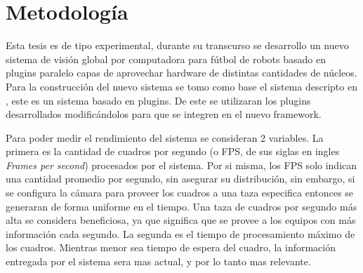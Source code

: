 
\section{Metodología}

Esta tesis es de tipo experimental, durante su transcurso se desarrollo un
nuevo sistema de visión global por computadora para fútbol de robots basado en
plugins paralelo capas de aprovechar hardware de distintas cantidades de
núcleos. Para la construcción del nuevo sistema se tomo como base el sistema
descripto en \cite{torres2014}, este es un sistema basado en plugins. De este
se utilizaran los plugins desarrollados modificándolos para que se integren en
el nuevo framework.

Para poder medir el rendimiento del sistema se consideran 2 variables. La
primera es la cantidad de cuadros por segundo (o FPS, de sus siglas en ingles
\emph{Frames per second}) procesados por el sistema. Por si misma, los FPS solo
indican una cantidad promedio por segundo, sin asegurar su distribución, sin
embargo, si se configura la cámara para proveer los cuadros a una taza
especifica entonces se generaran de forma uniforme en el tiempo. Una taza de
cuadros por segundo más alta se considera beneficiosa, ya que significa que se
provee a los equipos con más información cada segundo. La segunda es el tiempo
de procesamiento máximo de los cuadros. Mientras menor sea tiempo de espera del
cuadro, la información entregada por el sistema sera mas actual, y por lo tanto
mas relevante.
